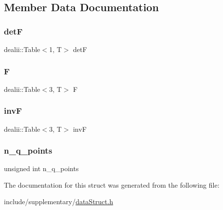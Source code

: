\subsection{Member Data Documentation}
\mbox{\label{structdeformation_map_aa1ff2dc8fb6f4f6e9125ca026505a977}} 
\subsubsection{\texorpdfstring{detF}{detF}}
{\footnotesize\ttfamily dealii\+::\+Table$<$1, T$>$ detF}

\mbox{\label{structdeformation_map_a7934bed7ba72b5e4a3af1fd8a4e14198}} 
\subsubsection{\texorpdfstring{F}{F}}
{\footnotesize\ttfamily dealii\+::\+Table$<$3, T$>$ F}

\mbox{\label{structdeformation_map_ae40deb9e4616ec6d0b77519e56646ce0}} 
\subsubsection{\texorpdfstring{invF}{invF}}
{\footnotesize\ttfamily dealii\+::\+Table$<$3, T$>$ invF}

\mbox{\label{structdeformation_map_a75df8197cf561419d8ead67373abeafd}} 
\subsubsection{\texorpdfstring{n\_q\_points}{n\_q\_points}}
{\footnotesize\ttfamily unsigned int n\+\_\+q\+\_\+points}



The documentation for this struct was generated from the following file\+:\begin{DoxyCompactItemize}
\item 
include/supplementary/\mbox{\hyperlink{data_struct_8h}{data\+Struct.\+h}}\end{DoxyCompactItemize}
